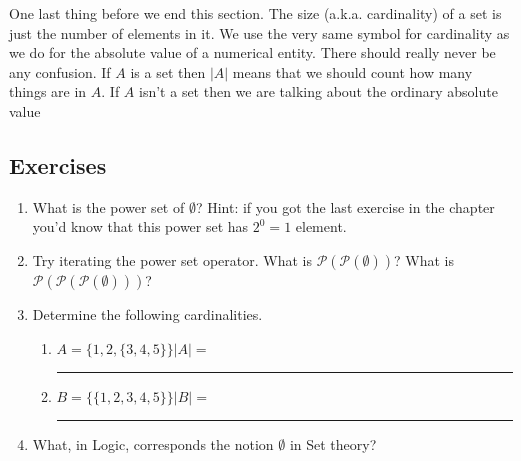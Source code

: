 \documentclass[10pt,]{book}
\theoremstyle{plain}
\theoremstyle{definition}
\theoremstyle{definition}
\numberwithin{equation}{section}
\newcommand{\hint}[1]{ }
\begin{document}
    One last thing before we end this section. The size (a.k.a. cardinality) of a set is just the number of elements in it. We use the
    very same symbol for cardinality as we do for the absolute value of a
    numerical entity. There should really never be any confusion. If \(A\) is
    a set then \(|A|\) means that we should count how many things are in \(A\).
    If \(A\) isn't a set then we are talking about the ordinary absolute value
\typeout{************************************************}
\typeout{************************************************}
\subsection[{Exercises}]{Exercises}\label{exercises-21}
\leavevmode%
\begin{enumerate}[label=(\alph*)]
\item\hypertarget{li-293}{}
        What is the power set of \(\emptyset\)?  Hint: if you got the last exercise
        in the chapter you'd know that this power set has \(2^0 = 1\) element.

        \hint{The power set of a set always includes the empty set as well as the whole set that we
        are forming the power set of.  In this case they happen to coincide so \({\mathcal P}(\emptyset) = \{ \emptyset \}\).  Notice that \(2^0 =1\).}
\item\hypertarget{li-294}{}
        Try iterating the power set operator.  What is \({\mathcal P}({\mathcal P}(\emptyset))\)?  What is \({\mathcal P}({\mathcal P}({\mathcal P}(\emptyset)))\)?

        \hint{I won't spoil you're fun, but as a check \({\mathcal P}({\mathcal P}(\emptyset))\) should have \(2\) elements, and \({\mathcal P}({\mathcal P}({\mathcal P}(\emptyset)))\) should have \(4\).}
\item\hypertarget{li-295}{}
    Determine the following cardinalities.

\begin{enumerate}[label=\roman*.]
\item\hypertarget{li-296}{}
          \(A = \{ 1, 2, \{3, 4, 5\}\}  |A| =\)\rule{36pt}{1pt}
\item\hypertarget{li-297}{}
          \(B = \{ \{1, 2, 3, 4, 5\} \}  |B| =\)\rule{36pt}{1pt}
\end{enumerate}

\item\hypertarget{li-298}{}
        What, in Logic, corresponds the notion \(\emptyset\) in Set theory?


\end{enumerate}
\end{document}
